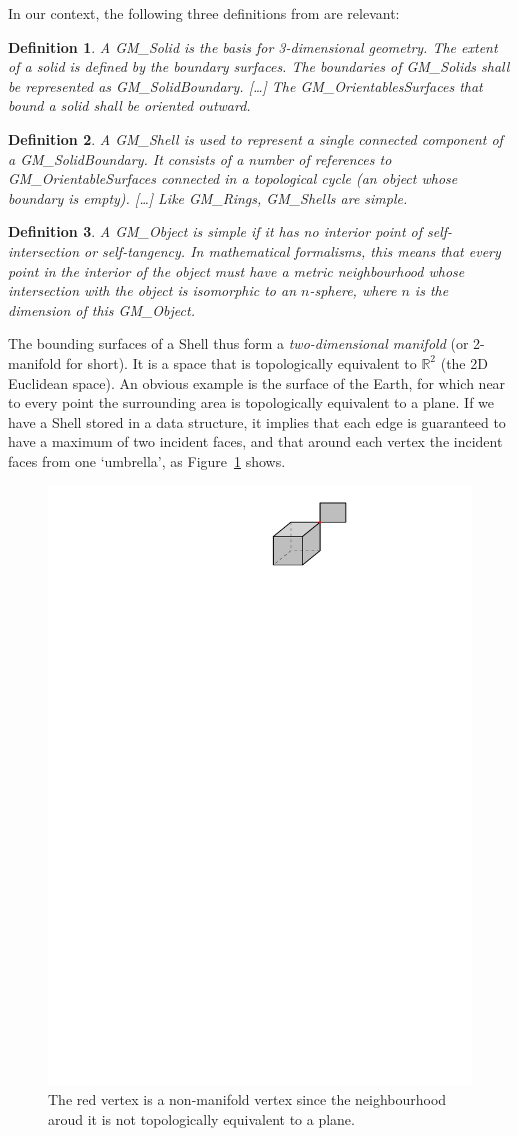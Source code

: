 \documentclass[a4paper,parskip=half,11pt]{scrartcl}
\newtheorem{definition}{Definition}
\begin{document}
In our context, the following three definitions from \citet{ISO19107} are relevant:
\begin{definition}
A GM\_Solid is the basis for 3-dimensional geometry. 
The extent of a solid is defined by the boundary surfaces.
The boundaries of GM\_Solids shall be represented as GM\_SolidBoundary.
[\ldots] 
The GM\_OrientablesSurfaces that bound a solid shall be oriented outward.
\end{definition}
\begin{definition}
A GM\_Shell is used to represent a single connected component of a GM\_SolidBoundary. 
It consists of a number of references to GM\_OrientableSurfaces connected in a topological cycle (an object whose boundary is empty). 
[\ldots] 
Like GM\_Rings, GM\_Shells are simple.
\end{definition}
\begin{definition}
A GM\_Object is \emph{simple} if it has no interior point of self-intersection or self-tangency. 
In mathematical formalisms, this means that every point in the interior of the object must have a metric neighbourhood whose intersection with the object is isomorphic to an $n$-sphere, where $n$ is the dimension of this GM\_Object.
\end{definition}

The bounding surfaces of a Shell thus form a \emph{two-dimensional manifold} (or 2-manifold for short).
It is a space that is topologically equivalent to $\mathbb{R}^2$ (the 2D Euclidean space).
An obvious example is the surface of the Earth, for which near to every point the surrounding area is topologically equivalent to a plane. 
If we have a Shell stored in a data structure, it implies that each edge is guaranteed to have a maximum of two incident faces, and that around each vertex the incident faces from one `umbrella', as Figure~\ref{fig:umbrella} shows.
\begin{figure}
  \centering
  \includegraphics[width=0.35\linewidth]{figs/umbrella}
  \caption{The red vertex is a non-manifold vertex since the neighbourhood aroud it is not topologically equivalent to a plane.}
\label{fig:umbrella}
\end{figure}
\end{document}
